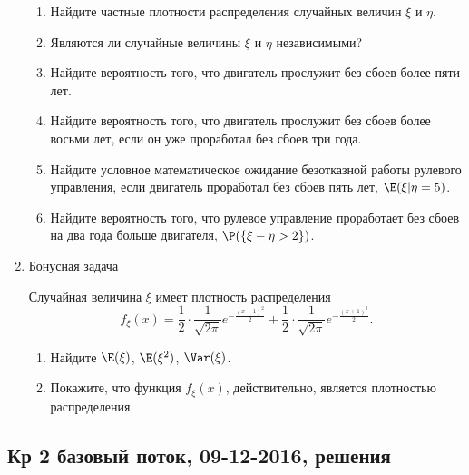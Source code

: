 \begin{enumerate}
\begin{enumerate}
  \item Найдите частные плотности распределения случайных величин $\xi$ и $\eta$.
  \item Являются ли случайные величины $\xi$ и $\eta$ независимыми?
  \item Найдите вероятность того, что двигатель прослужит без сбоев более пяти лет.
  \item Найдите вероятность того, что двигатель прослужит без сбоев более восьми лет, если он уже проработал без сбоев три года.
  \item Найдите условное математическое ожидание безотказной работы рулевого управления, если двигатель проработал без сбоев пять лет,  $\E(\xi | \eta = 5)$.
  \item Найдите вероятность того, что рулевое управление проработает без сбоев на два года больше двигателя,  $\P(\{\xi - \eta > 2\})$.
\end{enumerate}

\item Бонусная задача

Случайная величина $\xi$ имеет плотность распределения
\[
    f_{\xi}(x) = \frac{1}{2} \cdot \frac{1}{\sqrt{2\pi}}e^{-\frac{(x-1)^2}{2}} + \frac{1}{2} \cdot \frac{1}{\sqrt{2\pi}}e^{-\frac{(x+1)^2}{2}} \text{.}
\]

\begin{enumerate}
\item Найдите $\E(\xi)$, $\E(\xi^2)$, $\Var(\xi)$.
\item Покажите, что функция $f_{\xi}(x)$, действительно, является плотностью распределения.
\end{enumerate}


\end{enumerate}



\subsection{Кр 2 базовый поток, 09-12-2016, решения}

